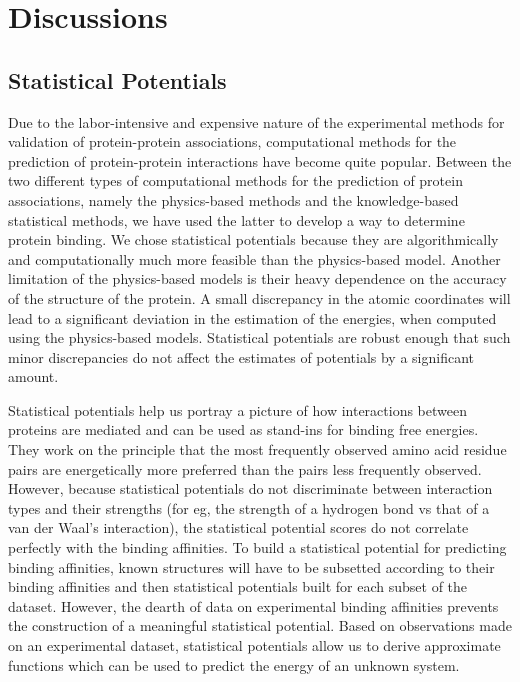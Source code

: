 \chapter{Discussions}
\label{discussions}

\pagestyle{fancy}


\fancyhf{}
\fancyfoot[RO,LE]{\thepage}

\section{Statistical Potentials}
Due to the labor-intensive and expensive nature of the experimental methods for validation of protein-protein associations, computational methods for the prediction of protein-protein interactions have become quite popular. Between the two different types of computational methods for the prediction of protein associations, namely the physics-based methods and the knowledge-based statistical methods, we have used the latter to develop a way to determine protein binding. We chose statistical potentials because they are algorithmically and computationally much more feasible than the physics-based model. Another limitation of the physics-based models is their heavy dependence on the accuracy of the structure of the protein. A small discrepancy in the atomic coordinates will lead to a significant deviation in the estimation of the energies, when computed using the physics-based models. Statistical potentials are robust enough that such minor discrepancies do not affect the estimates of potentials by a significant amount.
\par
Statistical potentials help us portray a picture of how interactions between proteins are mediated and can be used as stand-ins for binding free energies. They work on the principle that the most frequently observed amino acid residue pairs are energetically more preferred than the pairs less frequently observed. However, because statistical potentials do not discriminate between interaction types and their strengths (for eg, the strength of a hydrogen bond vs that of a van der Waal's interaction), the statistical potential scores do not correlate perfectly with the binding affinities. To build a statistical potential for predicting binding affinities, known structures will have to be subsetted according to their binding affinities and then statistical potentials built for each subset of the dataset. However, the dearth of data on experimental binding affinities prevents the construction of a meaningful statistical potential. Based on observations made on an experimental dataset, statistical potentials allow us to derive approximate functions which can be used to predict the energy of an unknown system. 


